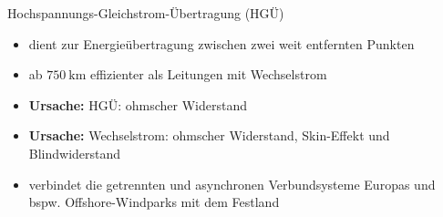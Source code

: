 \documentclass[aspectratio=1610, professionalfonts, 9pt]{beamer}
\begin{document}
\begin{frame}
  \begin{block}{Hochspannungs-Gleichstrom-Übertragung (HGÜ)}
    \begin{itemize}
      \item dient zur Energieübertragung zwischen zwei weit entfernten Punkten
      \item ab $\SI{750}{\kilo\meter}$ effizienter als Leitungen mit Wechselstrom
  \item[] \textbf{\textcolor{tugreen}{Ursache:}} HGÜ: ohmscher Widerstand
  \item[] \textbf{\textcolor{tulight}{Ursache:}} Wechselstrom: ohmscher Widerstand, Skin-Effekt und Blindwiderstand
      \item verbindet die getrennten und asynchronen Verbundsysteme Europas und bspw. Offshore-Windparks mit dem Festland
      \end{itemize}
\end{block}

 \end{frame}
\end{document}
